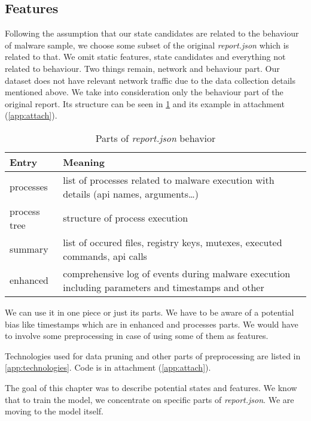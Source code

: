 \subsection{Features}
Following the assumption that our state candidates are related to the behaviour of malware sample, we choose some subset of the original \emph{report.json} which is related to that. We omit static features, state candidates and everything not related to behaviour. Two things remain, network and behaviour part. Our dataset does not have relevant network traffic due to the data collection details mentioned above. We take into consideration only the behaviour part of the original report. Its structure can be seen in \ref{tab:behavioral} and its example in attachment (\ref{app:attach}).

\begin{table}[h]
    \centering
    \caption{Parts of \emph{report.json} behavior}
    \begin{tabular}{p{2cm}p{12cm}} 
        \toprule
        \textbf{Entry} &
        \textbf{Meaning} \\
        \midrule
        processes & list of processes related to malware execution with details (api names, arguments\dots) \\
        \midrule
        process tree & structure of process execution\\
        \midrule
        summary & list of occured files, registry keys, mutexes, executed commands, api calls \\
        \midrule
        enhanced & comprehensive log of events during malware execution including parameters and timestamps and other\\
        \bottomrule
    \end{tabular}
    \label{tab:behavioral}
\end{table}

We can use it in one piece or just its parts. We have to be aware of a potential bias like timestamps which are in enhanced and processes parts. We would have to involve some preprocessing in case of using some of them as features.

Technologies used for data pruning and other parts of preprocessing are listed in \ref{app:technologies}. Code is in attachment (\ref{app:attach}).

The goal of this chapter was to describe potential states and features. We know that to train the model, we concentrate on specific parts of \emph{report.json}. We are moving to the model itself.




